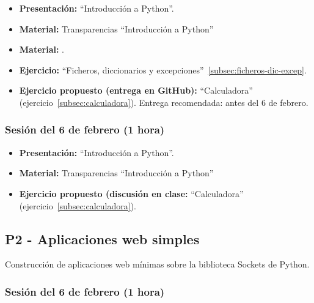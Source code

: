 \documentclass[a4paper,12pt]{article}
\begin{document}
\begin{itemize}
\item \textbf{Presentación:} ``Introducción a Python''.
\item \textbf{Material:} Transparencias ``Introducción a Python''

\item \textbf{Material:} .
\item \textbf{Ejercicio:} ``Ficheros, diccionarios y excepciones''~\ref{subsec:ficheros-dic-excep}.
\item \textbf{Ejercicio propuesto (entrega en GitHub):} ``Calculadora'' (ejercicio~\ref{subsec:calculadora}).
   Entrega recomendada: antes del 6 de febrero.
\end{itemize}

\subsubsection{Sesión del 6 de febrero (1 hora)}

\begin{itemize}
\item \textbf{Presentación:} ``Introducción a Python''.
\item \textbf{Material:} Transparencias ``Introducción a Python''

\item \textbf{Ejercicio propuesto (discusión en clase:} ``Calculadora'' (ejercicio~\ref{subsec:calculadora}).

\end{itemize}

\subsection{P2 - Aplicaciones web simples}

Construcción de aplicaciones web mínimas sobre la biblioteca Sockets de Python.


\subsubsection{Sesión del 6 de febrero (1 hora)}
\end{document}
